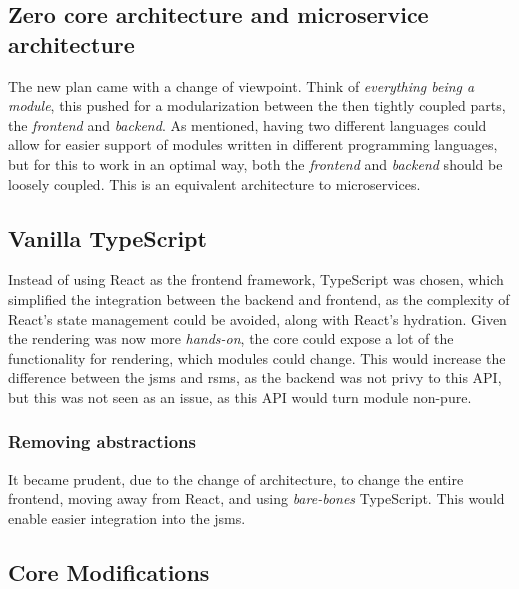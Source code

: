 \subsection{Zero core architecture and microservice architecture}

The new plan came with a change of viewpoint. Think of
\textit{everything being a module}, this pushed for a modularization between the
then tightly coupled parts, the \textit{frontend} and \textit{backend}. As
mentioned, having two different languages could allow for easier support of
modules written in different programming languages, but for this to work in an
optimal way, both the \textit{frontend} and \textit{backend} should be loosely
coupled. This is an equivalent architecture to microservices.

\subsection{Vanilla TypeScript}

Instead of using React as the frontend framework, TypeScript was chosen, which
simplified the integration between the backend and frontend, as the complexity
of React's state management could be avoided, along with React's hydration.
Given the rendering was now more \textit{hands-on}, the core could expose a lot
of the functionality for rendering, which modules could change. This would
increase the difference between the \gls{jsms} and \gls{rsms}, as the backend
was not privy to this API, but this was not seen as an issue, as this API would
turn module non-pure.

\subsubsection{Removing abstractions}

It became prudent, due to the change of architecture, to change the entire
frontend, moving away from React, and using \textit{bare-bones} TypeScript. This
would enable easier integration into the \gls{jsms}.

\subsection{Core Modifications}

